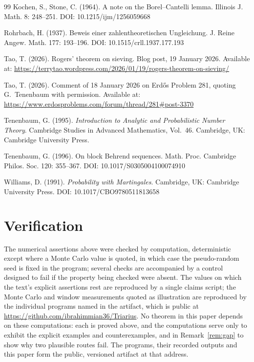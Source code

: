 \documentclass[11pt]{article}
\theoremstyle{plain}
\theoremstyle{definition}
\begin{document}
\begin{thebibliography}{99}
 Kochen, S., Stone, C. (1964). A note on the
Borel--Cantelli lemma. Illinois J. Math. 8: 248--251. DOI:
10.1215/ijm/1256059668

 Rohrbach, H. (1937). Beweis einer
zahlentheoretischen Ungleichung. J. Reine Angew. Math. 177:
193--196. DOI: 10.1515/crll.1937.177.193

 Tao, T. (2026). Rogers' theorem on sieving.
Blog post, 19 January 2026. Available at:
\url{https://terrytao.wordpress.com/2026/01/19/rogers-theorem-on-sieving/}

 Tao, T. (2026). Comment of 18 January 2026 on
Erd\H{o}s Problem 281, quoting G.~Tenenbaum with permission.
Available at:
\url{https://www.erdosproblems.com/forum/thread/281#post-3370}

 Tenenbaum, G. (1995). \emph{Introduction to
Analytic and Probabilistic Number Theory}. Cambridge Studies in
Advanced Mathematics, Vol.~46. Cambridge, UK: Cambridge University
Press.

 Tenenbaum, G. (1996). On block Behrend sequences.
Math. Proc. Cambridge Philos. Soc. 120: 355--367. DOI:
10.1017/S0305004100074910

 Williams, D. (1991). \emph{Probability with
Martingales}. Cambridge, UK: Cambridge University Press. DOI:
10.1017/CBO9780511813658

\end{thebibliography}

\appendix
\section{Verification}\label{sec:verification}

The numerical assertions above were checked by computation,
deterministic except where a Monte Carlo value is quoted, in
which case the pseudo-random seed is fixed in the program;
several checks are accompanied by a control designed to fail if
the property being checked were absent.  The values on which the
text's explicit assertions rest are reproduced by a single
claims script; the Monte Carlo and window measurements quoted
as illustration are reproduced by the individual programs named
in the artifact, which is public at
\url{https://github.com/ibrahimmian36/Triarius}.  No theorem in this paper depends on these computations:
each is proved above, and the computations serve only to exhibit
the explicit examples and counterexamples, and in
Remark~\ref{rem:gap} to show why two plausible routes fail.  The programs, their recorded outputs and this paper form the
public, versioned artifact at that address.
\end{document}

